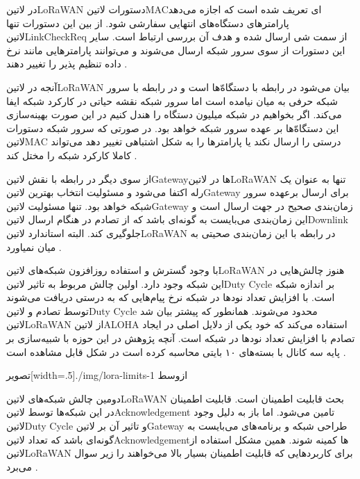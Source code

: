 در ‌لاتین{LoRaWAN} دستورات ‌لاتین{MAC}ای تعریف شده است که اجازه می‌دهد پارامترهای دستگاه‌های انتهایی سفارشی شود.
از بین این دستورات تنها ‌لاتین{LinkCheckReq} از سمت شی ارسال شده و هدف آن بررسی ارتباط است.
سایر این دستورات از سوی سرور شبکه ارسال می‌شوند و می‌توانند پارامترهایی مانند نرخ داده تنظیم پذیر را تغییر دهند
.

آنجه در ‌لاتین{LoRaWAN} بیان می‌شود در رابطه با دستگاه‌ّها است و در رابطه با سرور شبکه حرفی به میان نیامده است اما سرور شبکه نقشه حیاتی در کارکرد شبکه ایفا می‌کند.
اگر بخواهیم در شبکه میلیون دستگاه را هندل کنیم در این صورت بهینه‌سازی این دستگاه‌ّها بر عهده سرور شبکه خواهد بود. در صورتی که سرور شبکه دستورات ‌لاتین{MAC}
درستی را ارسال نکند یا پارامترها را به شکل اشتباهی تغییر دهد می‌تواند کاملا کارکرد شبکه را مختل کند
.

از سوی دیگر در رابطه با نقش ‌لاتین{Gateway}ها در ‌لاتین{LoRaWAN} تنها به عنوان یک رله اکتفا می‌شود و مسئولیت انتخاب بهترین ‌لاتین{Gateway} برای ارسال
برعهده سرور شبکه خواهد بود. تنها مسئولیت ‌لاتین{Gateway} زمان‌بندی صحیح در جهت ارسال است و این زمان‌بندی می‌بایست به گونه‌ای باشد که از تصادم در هنگام ارسال
‌لاتین{Downlink} جلوگیری کند. البته استاندارد ‌لاتین{LoRaWAN} در رابطه با این زمان‌بندی صحیتی به میان نمیاورد
.


با وجود گسترش و استفاده روزافزون شبکه‌های ‌لاتین{LoRaWAN} هنوز چالش‌هایی در این شبکه وجود دارد. اولین چالش مربوط به تاثیر
‌لاتین{Duty Cycle} بر اندازه شبکه است. با افزایش تعداد نودها در شبکه نرخ پیام‌هایی که به درستی دریافت می‌شوند توسط تصادم و
‌لاتین{Duty Cycle} محدود می‌شوند. همانطور که پیشتر بیان شد ‌لاتین{LoRaWAN} از ‌لاتین{ALOHA} استفاده می‌کند
که خود یکی از دلایل اصلی در ایجاد تصادم با افزایش تعداد نودها در شبکه است. آنچه پژوهش  در این حوزه
با شبیه‌سازی بر پایه سه کانال با بسته‌های ۱۰ بایتی محاسبه کرده است در شکل  قابل مشاهده است
.

‌تصویر[width=.5\textwidth]{./img/lora-limits-1}
‌ازوسط

دومین چالش شبکه‌های ‌لاتین{LoRaWAN} بحث قابلیت اطمینان است. قابلیت اطمینان در این شبکه‌ها توسط ‌لاتین{Acknowledgement} تامین می‌شود.
اما باز به دلیل وجود ‌لاتین{Duty Cycle} و تاثیر آن بر ‌لاتین{Gateway} طراحی شبکه و برنامه‌های می‌بایست به گونه‌ای باشد که تعداد ‌لاتین{Acknowledgement}ها کمینه شوند.
همین مشکل استفاده از ‌لاتین{LoRaWAN} برای کاربردهایی که قابلیت اطمینان بسیار بالا می‌خواهند را زیر سوال می‌برد
.

